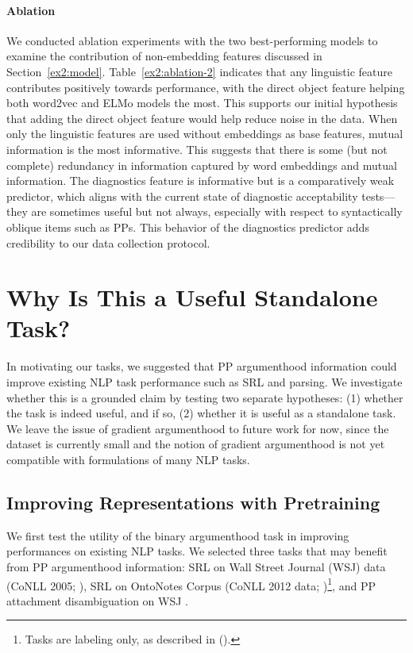 \documentclass[letterpaper]{article} %
\begin{document}
\paragraph{Ablation}
We conducted ablation experiments with the two best-performing models to examine the contribution of non-embedding features discussed in Section~\ref{ex2:model}. Table~\ref{ex2:ablation-2} indicates that any linguistic feature contributes positively towards performance, with the direct object feature helping both word2vec and ELMo models the most. This supports our initial hypothesis that  adding the direct object feature would help reduce noise in the data. When only the linguistic features are used without embeddings as base features, mutual information is the most informative. This suggests that there is some (but not complete) redundancy in information captured by word embeddings and mutual information. The diagnostics feature is informative but is a comparatively weak predictor, which aligns with the current state of diagnostic acceptability tests---they are sometimes useful but not always, especially with respect to syntactically oblique items such as PPs. This behavior of the diagnostics predictor adds credibility to our data collection protocol.

\section{Why Is This a Useful Standalone Task?}
\label{usefulness}
In motivating our tasks, we suggested that PP argumenthood information could improve existing NLP task performance such as SRL and parsing. We investigate whether this is a grounded claim by testing two separate hypotheses: (1) whether the task is indeed useful, and if so, (2) whether it is useful as a standalone task. We leave the issue of gradient argumenthood to future work for now, since the dataset is currently small and the notion of gradient argumenthood is not yet compatible with formulations of many NLP tasks.

\subsection{Improving Representations with Pretraining}
We first test the utility of the binary argumenthood task in improving performances on existing NLP tasks. We selected three tasks that may benefit from PP argumenthood information: SRL on Wall Street Journal (WSJ) data (CoNLL 2005; \citeauthor{carreras2005introduction} \citeyear{carreras2005introduction}), SRL on OntoNotes Corpus (CoNLL 2012 data; \citeauthor{pradhan2012conll} \citeyear{pradhan2012conll})\footnote{Tasks are labeling only, as described in \citeauthor{tenney2019what} (\citeyear{tenney2019what}).}, and PP attachment disambiguation on WSJ \cite{belinkov2014exploring}.
\end{document}
